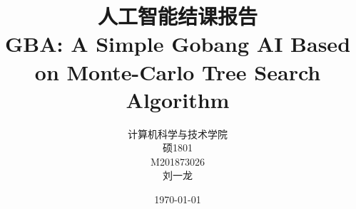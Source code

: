 

\documentclass[UTF8,cs4size]{ctexart}
\usepackage{amsmath,amssymb,url}
\usepackage[super,square,comma,sort]{natbib} %
\usepackage[left=3cm,right=3cm]{geometry}

\usepackage{graphicx}
\graphicspath{figures/}


\usepackage{hyperref}

\usepackage{titling}
\renewcommand\maketitlehooka{\null\mbox{}\vfill}
\renewcommand\maketitlehookd{\vfill\null}

\usepackage{tocloft}
\renewcommand\cftsecfont{\normalfont}
\renewcommand\cftsecpagefont{\normalfont}
\renewcommand{\cftsecleader}{\cftdotfill{\cftsecdotsep}}
\renewcommand\cftsecdotsep{\cftdot}
\renewcommand\cftsubsecdotsep{\cftdot}
\renewcommand{\contentsname}{\hfill\bfseries\Large 目录\hfill}   
\setlength{\cftbeforesecskip}{10pt}

 
\title{人工智能结课报告\\ \bigskip \textbf{GBA: A Simple Gobang AI Based on Monte-Carlo Tree Search Algorithm}}
\author{计算机科学与技术学院\\ 硕1801\\ M201873026\\ 刘一龙}
\date{\today}


\usepackage{fancyhdr}
\setlength{\headheight}{15.2pt}
\pagestyle{fancy}
\lhead{\leftmark}
\cfoot{\thepage}




\maketitle
\newpage


